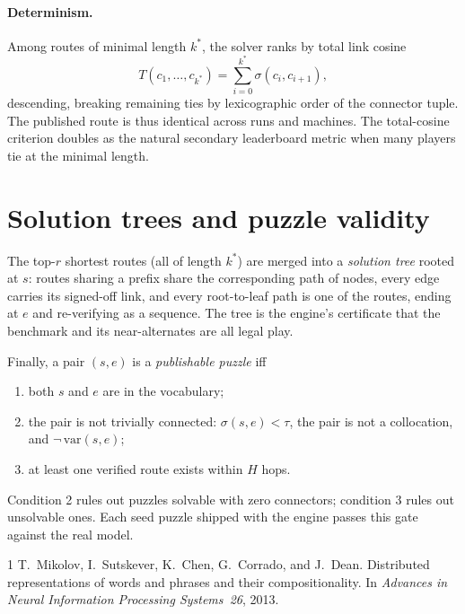 \documentclass[11pt]{article}
\theoremstyle{definition}
\newcommand{\cosim}{\sigma}
\newcommand{\thresh}{\tau}
\begin{document}
\paragraph{Determinism.}
Among routes of minimal length $k^\ast$, the solver ranks by total link cosine
\[
  T(c_1, \dots, c_{k^\ast})
  = \sum_{i=0}^{k^\ast} \cosim(c_i, c_{i+1}),
\]
descending, breaking remaining ties by lexicographic order of the connector
tuple. The published route is thus identical across runs and machines. The
total-cosine criterion doubles as the natural secondary leaderboard metric
when many players tie at the minimal length.

\section{Solution trees and puzzle validity}

The top-$r$ shortest routes (all of length $k^\ast$) are merged into a
\emph{solution tree} rooted at $s$: routes sharing a prefix share the
corresponding path of nodes, every edge carries its signed-off link, and every
root-to-leaf path is one of the routes, ending at $e$ and re-verifying as a
sequence. The tree is the engine's certificate that the benchmark and its
near-alternates are all legal play.

Finally, a pair $(s, e)$ is a \emph{publishable puzzle} iff
\begin{enumerate}
  \item both $s$ and $e$ are in the vocabulary;
  \item the pair is not trivially connected: $\cosim(s, e) < \thresh$, the
        pair is not a collocation, and $\neg\,\mathrm{var}(s, e)$;
  \item at least one verified route exists within $H$ hops.
\end{enumerate}
Condition 2 rules out puzzles solvable with zero connectors; condition 3 rules
out unsolvable ones. Each seed puzzle shipped with the engine passes this
gate against the real model.

\begin{thebibliography}{1}
T.~Mikolov, I.~Sutskever, K.~Chen, G.~Corrado, and J.~Dean.
\newblock Distributed representations of words and phrases and their
  compositionality.
\newblock In \emph{Advances in Neural Information Processing Systems~26},
  2013.
\end{thebibliography}
\end{document}

